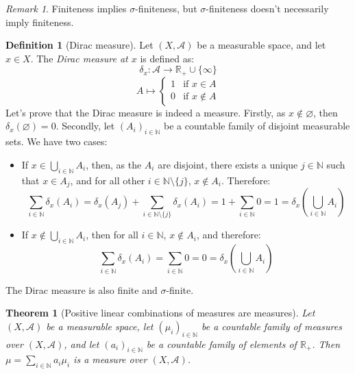 \documentclass{article}
\newtheorem{theorem}{Theorem}[section]
\theoremstyle{definition}
\newtheorem{definition}{Definition}[section]
\theoremstyle{remark}
\newtheorem*{remark}{Remark}
\theoremstyle{example}
\newcommand{\tif}{\text{if }}
\begin{document}
\begin{remark}
    Finiteness implies $\sigma$-finiteness, but $\sigma$-finiteness doesn't necessarily imply finiteness.
\end{remark}

\begin{definition}[Dirac measure]
    Let $(X, \mathcal{A})$ be a measurable space, and let $x \in X$. The \textit{Dirac measure at $x$} is defined as:
        $$\delta_x : \mathcal{A} \rightarrow \mathbb{R}_+ \cup \{\infty\}$$
        $$A \mapsto \begin{cases} 1 & \tif x \in A\\ 0 & \tif x \notin A\end{cases}$$
    Let's prove that the Dirac measure is indeed a measure. Firstly, as $x \notin \varnothing$, then $\delta_x(\varnothing) = 0$. Secondly, let $(A_i)_{i \in \mathbb{N}}$ be a countable family of disjoint measurable sets. We have two cases:
    \begin{itemize}
        \item If $x \in \bigcup_{i \in \mathbb{N}} A_i$, then, as the $A_i$ are disjoint, there exists a unique $j \in \mathbb{N}$ such that $x \in A_j$, and for all other $i \in \mathbb{N} \setminus \{j\}$, $x \notin A_i$. Therefore:
            $$\sum_{i \in \mathbb{N}} \delta_x(A_i) = \delta_x(A_j) + \sum_{i \in \mathbb{N} \setminus \{j\}} \delta_x(A_i) = 1 + \sum_{i \in \mathbb{N}} 0 = 1 = \delta_x(\bigcup_{i \in \mathbb{N}} A_i)$$
        \item If $x \notin \bigcup_{i \in \mathbb{N}} A_i$, then for all $i \in \mathbb{N}$, $x \notin A_i$, and therefore:
        $$\sum_{i \in \mathbb{N}} \delta_x(A_i) = \sum_{i \in \mathbb{N}} 0 = 0 = \delta_x(\bigcup_{i \in \mathbb{N}} A_i)$$
    \end{itemize}
    The Dirac measure is also finite and $\sigma$-finite.
\end{definition}

\begin{theorem}[Positive linear combinations of measures are measures] \label{thm:pos_lin_comb_measures}
    Let $(X, \mathcal{A})$ be a measurable space, let $(\mu_i)_{i \in \mathbb{N}}$ be a countable family of measures over $(X, \mathcal{A})$, and let $(a_i)_{i \in \mathbb{N}}$ be a countable family of elements of $\mathbb{R}_+$. Then $\mu = \sum_{i \in \mathbb{N}} a_i \mu_i$ is a measure over $(X, \mathcal{A})$.
\end{theorem}
\end{document}
